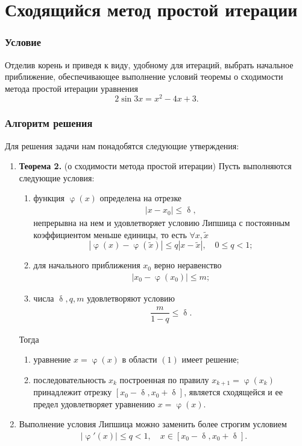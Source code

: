 \documentclass[a4paper, 12pt]{article}
\renewcommand{\leq}{\leqslant}
\renewcommand{\delta}{\updelta}
\renewcommand{\varphi}{\upvarphi}
\begin{document}
	\section*{Сходящийся метод простой итерации}
	\subsubsection*{Условие}
	Отделив корень и приведя к виду, удобному для итераций, выбрать начальное приближение, обеспечивающее выполнение условий теоремы о сходимости метода простой итерации уравнения $$2\sin3x = x^2 - 4x + 3.$$
	\subsubsection*{Алгоритм решения}
	Для решения задачи нам понадобятся следующие утверждения:
	\begin{enumerate}
		\item \textbf{Теорема 2.}
		(о сходимости метода простой итерации)
		Пусть выполняются следующие условия:\begin{enumerate}
			\item функция $\varphi(x)$ определена на отрезке \begin{eqnarray}
				|x - x_0| \leq \delta,
			\end{eqnarray} непрерывна на нем и удовлетворяет условию Липшица с постоянным коэффициентом меньше единицы, то есть $\forall x, \widetilde{x}$ $$|\varphi(x) - \varphi(\widetilde{x})| \leq q |x - \widetilde{x}| ,\quad 0 \leq q < 1;$$
			\item для начального приближения $x_0$ верно неравенство \begin{eqnarray}
				|x_0 - \varphi(x_0)| \leq m;
			\end{eqnarray}
			\item числа $\delta, q, m$ удовлетворяют условию 
			\begin{eqnarray}
				\dfrac{m}{1-q}\leq \delta.
			\end{eqnarray}
		\end{enumerate}
		Тогда \begin{enumerate}
			\item уравнение $x = \varphi(x)$ в области $(1)$ имеет решение;
			\item последовательность $x_k$ построенная по правилу $x_{k+1} = \varphi(x_k)$ принадлежит отрезку $[x_0 - \delta, x_0 + \delta]$, является сходящейся и ее предел удовлетворяет уравнению $x = \varphi(x)$.
		\end{enumerate}
		\item Выполнение условия Липшица можно заменить более строгим условием 
		\begin{eqnarray}
		|\varphi'(x)| \leq q < 1,\quad x \in [x_0-\delta, x_0 + \delta].
		\end{eqnarray}
	\end{enumerate}
\end{document}
